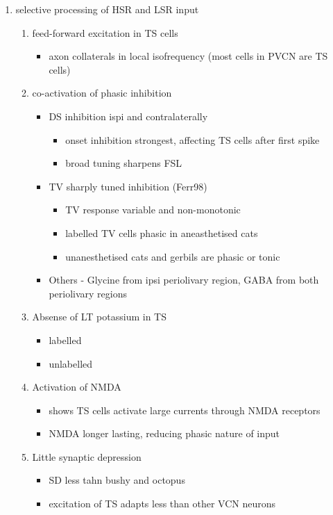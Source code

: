 \begin{enumerate}
\item selective processing of HSR and LSR input
\begin{enumerate}
\item feed-forward excitation in TS cells
\begin{itemize}
\item axon collaterals in local isofrequency (most cells in PVCN are TS cells)
\end{itemize}
\item co-activation of phasic inhibition
\begin{itemize}
\item DS inhibition ispi and contralaterally
\begin{itemize}
\item onset inhibition strongest, affecting TS cells after first spike
\item broad tuning sharpens FSL
\end{itemize}
\item TV sharply tuned inhibition (Ferr98)
\begin{itemize}
\item TV response variable and non-monotonic
\item \citep{Rhode:1999}  labelled TV cells phasic in aneasthetised cats
\item unanesthetised cats and gerbils are phasic or tonic  \citep{DingVoigt:1997,ShofnerYoung:1985}
\end{itemize}
\item Others - Glycine from ipsi periolivary region, GABA from both
          periolivary regions \citep{AdamsWarr:1976,ShoreHelfertEtAl:1991,OstapoffBensonEtAl:1997}
\end{itemize}
\item Absense of LT potassium in TS
\begin{itemize}
\item labelled \citep{ManisMarx:1991,BalOertel:2001,FerragamoOertel:2002,CaoShatadalEtAl:2007}
\item unlabelled \citep{RothmanManis:2003,RothmanManis:2003a,RothmanManis:2003b,Rothman:1999}
\end{itemize}
\item Activation of NMDA
\begin{itemize}
\item \citep{CaoOertel:2010} shows TS cells activate large currents through NMDA receptors
\item NMDA longer lasting, reducing phasic nature of input
\end{itemize}
\item Little synaptic depression
\begin{itemize}
\item SD less tahn bushy and octopus \citep{WuOertel:1987,ChandaXu-Friedman:2010,CaoOertel:2010}
\item excitation of TS adapts less than other VCN neurons
\end{itemize}
\end{enumerate}
\end{enumerate}
